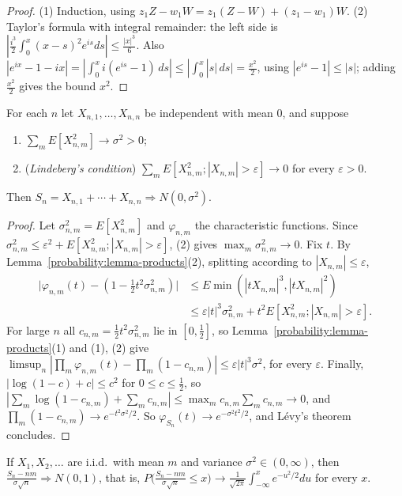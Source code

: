 \begin{proof}
(1) Induction, using $z_1Z - w_1W = z_1(Z - W) + (z_1 - w_1)W$. (2) Taylor's formula with integral remainder: the left side is $|\frac{i^3}{2}\int_0^x(x - s)^2e^{is}ds| \leq \frac{|x|^3}{6}$. Also
$|e^{ix} - 1 - ix| = |\int_0^xi(e^{is} - 1)\,ds| \leq |\int_0^x|s|\,ds| = \frac{x^2}{2}$, using $|e^{is} - 1| \leq |s|$; adding $\frac{x^2}{2}$ gives the bound $x^2$.
\end{proof}

\begin{theorem}\label{probability:theorem-lindeberg}
For each $n$ let $X_{n,1}, \ldots, X_{n,n}$ be independent with mean $0$, and suppose
\begin{enumerate}
\item $\sum_mE[X_{n,m}^2] \to \sigma^2 > 0$;
\item (\emph{Lindeberg's condition}) $\sum_mE[X_{n,m}^2; |X_{n,m}| > \varepsilon] \to 0$ for every $\varepsilon > 0$.
\end{enumerate}
Then $S_n = X_{n,1} + \cdots + X_{n,n} \Rightarrow N(0, \sigma^2)$.
\end{theorem}

\begin{proof}
Let $\sigma_{n,m}^2 = E[X_{n,m}^2]$ and $\varphi_{n,m}$ the characteristic functions. Since $\sigma_{n,m}^2 \leq \varepsilon^2 + E[X_{n,m}^2; |X_{n,m}| > \varepsilon]$, (2) gives $\max_m\sigma_{n,m}^2 \to 0$. Fix $t$. By
Lemma~\ref{probability:lemma-products}(2), splitting according to $|X_{n,m}| \leq \varepsilon$,
\[
\begin{aligned}
\bigl|\varphi_{n,m}(t) - (1 - \tfrac12t^2\sigma_{n,m}^2)\bigr| &\leq E\min(|tX_{n,m}|^3, |tX_{n,m}|^2) \\
&\leq \varepsilon|t|^3\sigma_{n,m}^2 + t^2E[X_{n,m}^2; |X_{n,m}| > \varepsilon].
\end{aligned}
\]
For large $n$ all $c_{n,m} = \frac12t^2\sigma_{n,m}^2$ lie in $[0, \frac12]$, so Lemma~\ref{probability:lemma-products}(1) and (1), (2) give
$\limsup_n|\prod_m\varphi_{n,m}(t) - \prod_m(1 - c_{n,m})| \leq \varepsilon|t|^3\sigma^2$, for every $\varepsilon$. Finally, $|\log(1 - c) + c| \leq c^2$ for $0 \leq c \leq \frac12$, so
$|\sum_m\log(1 - c_{n,m}) + \sum_mc_{n,m}| \leq \max_mc_{n,m}\sum_mc_{n,m} \to 0$, and $\prod_m(1 - c_{n,m}) \to e^{-t^2\sigma^2/2}$. So $\varphi_{S_n}(t) \to e^{-\sigma^2t^2/2}$, and L\'evy's theorem concludes.
\end{proof}

\begin{corollary}\label{probability:corollary-clt}
If $X_1, X_2, \ldots$ are i.i.d.\ with mean $m$ and variance $\sigma^2 \in (0, \infty)$, then $\frac{S_n - nm}{\sigma\sqrt n} \Rightarrow N(0, 1)$, that is,
$P\bigl(\frac{S_n - nm}{\sigma\sqrt n} \leq x\bigr) \to \frac{1}{\sqrt{2\pi}}\int_{-\infty}^xe^{-u^2/2}du$ for every $x$.
\end{corollary}

